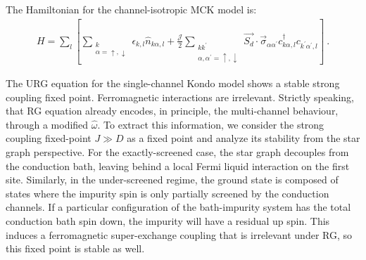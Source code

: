 \documentclass[10pt]{iopart}
\begin{document}
The Hamiltonian for the channel-isotropic MCK model is:
\begin{eqnarray}
	H = \sum_l\left[\sum_{\substack{k\\\alpha=\uparrow,\downarrow}}\epsilon_{k,l} \hat n_{k\alpha,l} + \frac{\mathcal{J}}{2}\sum_{\substack{kk^\prime\\\alpha,\alpha^\prime= \uparrow,\downarrow}} \vec{S_d}\cdot\vec{\sigma}_{\alpha\alpha^\prime}c_{k\alpha,l}^\dagger c_{k^\prime\alpha^\prime, l}\right]~.
\end{eqnarray}

The URG equation for the single-channel Kondo model \cite{kondo_urg} shows a stable strong coupling fixed point. Ferromagnetic interactions are irrelevant. Strictly speaking, that RG equation already encodes, in principle, the multi-channel behaviour, through a modified \(\hat \omega\). To extract this information, we consider the strong coupling fixed-point \(J \gg D\) as a fixed point and analyze its stability from the star graph perspective. For the exactly-screened case, the star graph decouples from the conduction bath, leaving behind a local Fermi liquid interaction on the first site. Similarly, in the under-screened regime, the ground state is composed of states where the impurity spin is only partially screened by the conduction channels. If a particular configuration of the bath-impurity system has the total conduction bath spin down, the impurity will have a residual up spin. This induces a ferromagnetic super-exchange coupling that is irrelevant under RG, so this fixed point is stable as well. 
\end{document}
